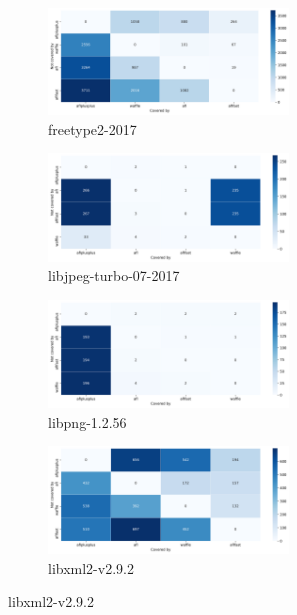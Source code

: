 \begin{figure}
    \centering
    \begin{subfigure}[t]{\textwidth}
        \centering
        \includegraphics[width=0.70\textwidth]{Experiments/freetype2-2017_pairwise_unique_coverage_plot.png}
        \caption{freetype2-2017}
        \label{fig:sub:freetype-cov-uniq}
    \end{subfigure}

    \begin{subfigure}[t]{\textwidth}
        \centering
        \includegraphics[width=0.70\textwidth]{Experiments/libjpeg-turbo-07-2017_pairwise_unique_coverage_plot.png}
        \caption{libjpeg-turbo-07-2017}
        \label{fig:sub:libjpeg-cov-uniq}
    \end{subfigure}

    \begin{subfigure}[t]{\textwidth}
        \centering
        \includegraphics[width=0.70\textwidth]{Experiments/libpng-1.2.56_pairwise_unique_coverage_plot.png}
        \caption{libpng-1.2.56}
        \label{fig:sub:libpng-cov-uniq}
    \end{subfigure}

    \begin{subfigure}[t]{\textwidth}
        \centering
        \includegraphics[width=0.70\textwidth]{Experiments/libxml2-v2.9.2_pairwise_unique_coverage_plot.png}
        \caption{libxml2-v2.9.2}
        \label{fig:sub:libxml-cov-uniq}
    \end{subfigure}


\end{figure}
